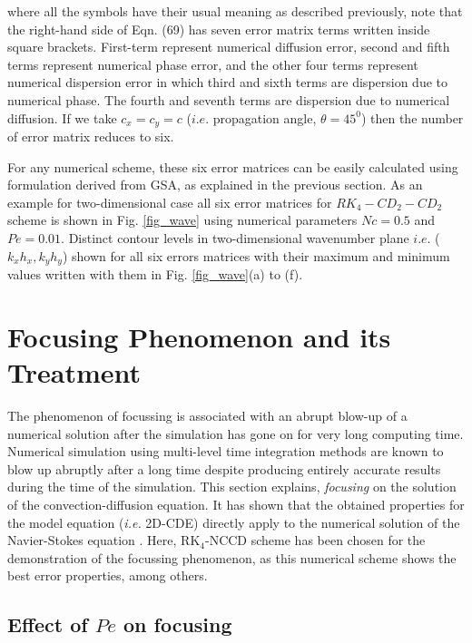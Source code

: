 \documentclass[showpacs,preprintnumbers,amsmath,amssymb]{revtex4-1} %
\begin{document}
where all the symbols have their usual meaning as described previously, note that the right-hand side of Eqn. (69) has seven error matrix terms written inside square brackets. First-term represent numerical diffusion error, second and fifth terms represent numerical phase error, and the other four terms represent numerical dispersion error in which third and sixth terms are dispersion due to numerical phase. The fourth and seventh terms are dispersion due to numerical diffusion. If we take $c_x=c_y=c$ ($\textit{i.e.}$ propagation angle, $\theta=45^0$) then the number of error matrix reduces to six.

For any numerical scheme, these six error matrices can be easily calculated using formulation derived from GSA, as explained in the previous section. As an example for two-dimensional case all six error matrices for $RK_4-CD_2-CD_2$ scheme is shown in Fig. \ref{fig_wave} using numerical parameters $Nc=0.5$ and $Pe=0.01$. Distinct contour levels in two-dimensional wavenumber plane $\textit{i.e.}$ ($k_xh_x, k_yh_y$) shown for all six errors matrices with their maximum and minimum values written with them in Fig. \ref{fig_wave}(a) to (f).

\section{Focusing Phenomenon and its Treatment}

The phenomenon of focussing is associated with an abrupt blow-up of a numerical solution after the simulation has gone on for very long computing time. Numerical simulation using multi-level time integration methods are known to blow up abruptly after a long time despite producing entirely accurate results during the time of the simulation. This section explains, \textit{focusing} on the solution of the convection-diffusion equation. It has shown that the obtained properties for the model equation (\textit{i.e.} 2D-CDE) directly apply to the numerical solution of the Navier-Stokes equation \cite{SVajjala2020}. Here, RK$_4$-NCCD scheme has been chosen for the demonstration of the focussing phenomenon, as this numerical scheme shows the best error properties, among others.

\subsection{Effect of $Pe$ on focusing}
\end{document}
